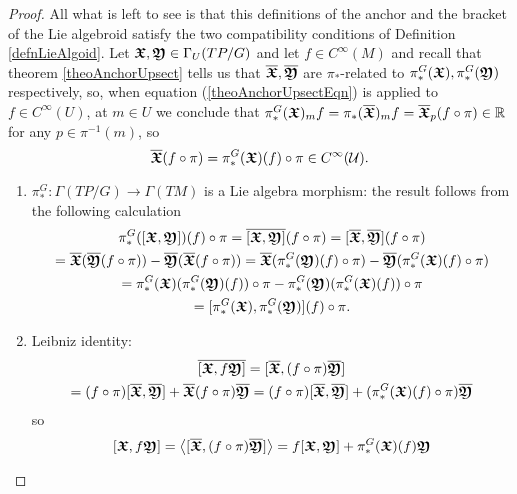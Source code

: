 \begin{proof}
All what is left to see is that this definitions of the anchor and the bracket of the Lie algebroid satisfy the two compatibility conditions of Definition \ref{defnLieAlgoid}. Let $\bm{\mathfrak{X}}, \bm{\mathfrak{Y}} \in \Gamma_U(TP/G)$ and let $f \in C^{\infty}(M)$ and recall that theorem \ref{theoAnchorUpsect} tells us that $\overline{\bm{\bm{\mathfrak{X}}}}, \overline{\bm{\bm{\mathfrak{Y}}}}$ are $\pi_*$-related to $\pi_*^G(\bm{\mathfrak{X}}), \pi_*^G(\bm{\mathfrak{Y}})$ respectively, so, when equation (\ref{theoAnchorUpsectEqn}) is applied to $f \in C^\infty(U)$, at $m\in U$ we conclude that 
    $\pi_*^G(\bm{\mathfrak{X}})_mf = \pi_*(\overline{\bm{\bm{\mathfrak{X}}}})_m f = \overline{\bm{\bm{\mathfrak{X}}}}_p(f \circ \pi) \in \mathbb{R}$ for any $p \in \pi^{-1}(m)$, so 
    \begin{equation}
        \overline{\bm{\bm{\mathfrak{X}}}}(f \circ \pi) = \pi_*^G(\bm{\mathfrak{X}})(f) \circ \pi \in C^\infty(\mathcal U).
    \end{equation}

    \begin{enumerate}
    
    \item $\pi_*^G: \Gamma(TP/G) \to \Gamma(TM)$ is a Lie algebra morphism: the result follows from the following calculation
    \begin{multline*}
        \pi_*^G([\bm{\mathfrak{X}}, \bm{\mathfrak{Y}}])(f) \circ \pi
        = \overline{[\bm{\mathfrak{X}}, \bm{\mathfrak{Y}}]}(f \circ \pi)
        = [\overline{\bm{\mathfrak{X}}}, \overline{\bm{\mathfrak{Y}}}](f \circ \pi) \\
        = \overline{\bm{\mathfrak{X}}} (\overline{\bm{\mathfrak{Y}}}(f \circ \pi)) - \overline{\bm{\mathfrak{Y}}} (\overline{\bm{\mathfrak{X}}}(f \circ \pi)) 
        = \overline{\bm{\mathfrak{X}}} (\pi_*^G(\bm{\mathfrak{Y}})(f) \circ \pi) - \overline{\bm{\mathfrak{Y}}} (\pi_*^G(\bm{\mathfrak{X}})(f) \circ \pi)\\
        = \pi_*^G(\bm{\mathfrak{X}})(\pi_*^G(\bm{\mathfrak{Y}})(f)) \circ \pi - \pi_*^G(\bm{\mathfrak{Y}})(\pi_*^G(\bm{\mathfrak{X}})(f)) \circ \pi\\
        = [\pi_*^G(\bm{\mathfrak{X}}), \pi_*^G(\bm{\mathfrak{Y}})](f) \circ \pi.
    \end{multline*}
    
    \item Leibniz identity:
    \begin{multline*}
        \overline{[\bm{\mathfrak{X}}, f \bm{\mathfrak{Y}}]} 
        =[\overline{\bm{\bm{\mathfrak{X}}}}, (f \circ \pi) \overline{\bm{\bm{\mathfrak{Y}}}}] \\
        = (f \circ \pi)[\overline{\bm{\bm{\mathfrak{X}}}}, \overline{\bm{\bm{\mathfrak{Y}}}}] + \overline{\bm{\bm{\mathfrak{X}}}}(f \circ \pi) \overline{\bm{\bm{\mathfrak{Y}}}} = 
        (f \circ \pi)[\overline{\bm{\bm{\mathfrak{X}}}}, \overline{\bm{\bm{\mathfrak{Y}}}}] + (\pi_*^G(\bm{\mathfrak{X}})(f) \circ \pi) \overline{\bm{\bm{\mathfrak{Y}}}}
    \end{multline*} so 
    \[
        [\bm{\mathfrak{X}}, f \bm{\mathfrak{Y}}] = \left\langle [\overline{\bm{\bm{\mathfrak{X}}}}, (f \circ \pi) \overline{\bm{\bm{\mathfrak{Y}}}}] \right\rangle = f[\bm{\mathfrak{X}}, \bm{\mathfrak{Y}}] + \pi_*^G(\bm{\mathfrak{X}})(f) \bm{\mathfrak{Y}}
    \]
    
    \end{enumerate}

\end{proof}

